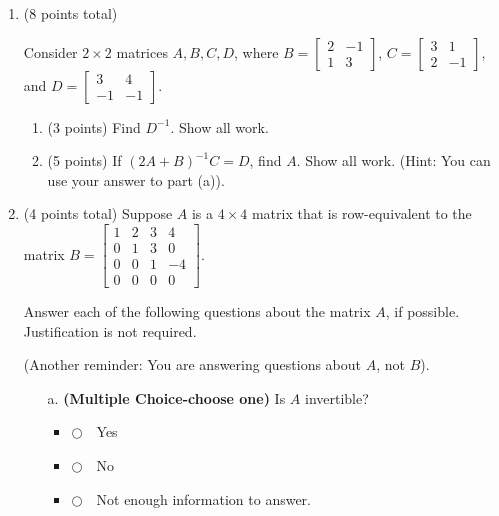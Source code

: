 \documentclass[12pt]{extarticle}
\newcommand{\chooseone}{{\Large$\Circle$\ \ }}
\begin{document}
\begin{enumerate}
               \vspace{3in} 


\newpage


    \item (8 points total) 
    
    Consider $2\times 2$ matrices $A,B,C,D$, where $B=\begin{bmatrix}2 & -1 \\ 1 & 3\end{bmatrix}$, $C=\begin{bmatrix}3& 1 \\ 2 & -1\end{bmatrix}$, and $D=\begin{bmatrix}3& 4 \\ -1 & -1\end{bmatrix}$.
\begin{enumerate}[label=\alph*.]
\item (3 points) Find $D^{-1}$. Show all work.
\vfill
\item (5 points) If $(2A+B)^{-1}C=D$, find $A$. Show all work. (Hint: You can use your answer to part (a)).
\end{enumerate}
\vfill


 
 \newpage


\item (4 points total) Suppose $A$ is a $4\times 4$ matrix that is row-equivalent to the matrix $B=\left[\begin{array}{cccc}
1 & 2 & 3 & 4 
\\
 0 & 1 & 3 & 0 
\\
 0 & 0 & 1 & -4 
\\
 0 & 0 & 0 & 0 
\end{array}\right].$

Answer each of the following questions about the matrix $A$, if possible. Justification is not required.

(Another reminder: You are answering questions about $A$, not $B$).


\begin{itemize}
   \item[a.]  \textbf{(Multiple Choice-choose one)} Is $A$ invertible?
\begin{itemize}[label={}]
\item \chooseone Yes
\item \chooseone No
\item \chooseone Not enough information to answer.
\end{itemize}    



\end{itemize}
\end{enumerate}
\end{document}
